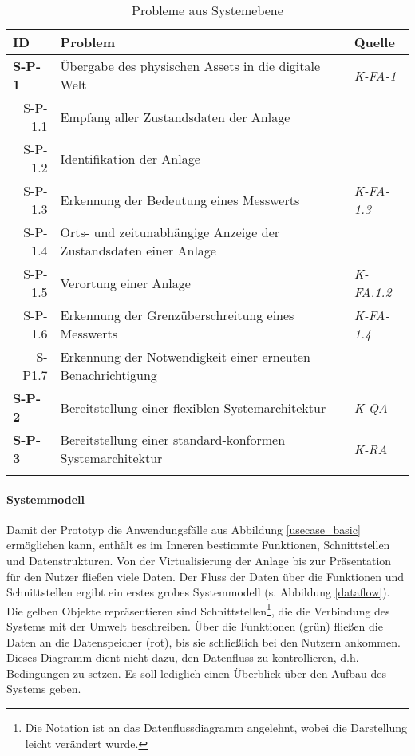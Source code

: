 \begin{table}[ht!]
  \begin{tabularx}{\textwidth}{@{}lXp{2cm}@{}}
      \toprule
      ID                & Problem & Quelle \\
      \midrule
      \textbf{S-P-1}              &       Übergabe des physischen Assets in die digitale Welt               & \textit{K-FA-1}                \\
      \multicolumn{1}{r}{S-P-1.1} &  Empfang aller Zustandsdaten der Anlage     \\
      \multicolumn{1}{r}{S-P-1.2} &  Identifikation der Anlage     \\
      \multicolumn{1}{r}{S-P-1.3} &  Erkennung der Bedeutung eines Messwerts  & \textit{K-FA-1.3}\\
      \multicolumn{1}{r}{S-P-1.4} &  Orts- und zeitunabhängige Anzeige der Zustandsdaten einer Anlage     \\
      \multicolumn{1}{r}{S-P-1.5} &  Verortung einer Anlage & \textit{K-FA.1.2}\\
      \multicolumn{1}{r}{S-P-1.6} &  Erkennung der Grenzüberschreitung eines Messwerts & \textit{K-FA-1.4}\\
      \multicolumn{1}{r}{S-P1.7} &  Erkennung der Notwendigkeit einer erneuten Benachrichtigung\\
      \textbf{S-P-2}              &  Bereitstellung einer flexiblen Systemarchitektur  & \textit{K-QA} \\
      \textbf{S-P-3}              &  Bereitstellung einer standard-konformen Systemarchitektur & \textit{K-RA} \\
      \addlinespace
      \bottomrule
  \end{tabularx}
  \label{system_probleme}
  \caption{Probleme aus Systemebene}

\end{table}


\paragraph{Systemmodell}

Damit der Prototyp die Anwendungsfälle aus Abbildung \ref{usecase_basic} ermöglichen kann, enthält es im Inneren bestimmte Funktionen, Schnittstellen und Datenstrukturen. Von der Virtualisierung der Anlage bis zur Präsentation für den Nutzer fließen viele Daten. Der Fluss der Daten über die Funktionen und Schnittstellen ergibt ein erstes grobes Systemmodell (s. Abbildung \ref{dataflow}). Die gelben Objekte repräsentieren sind Schnittstellen\footnote{Die Notation ist an das Datenflussdiagramm angelehnt, wobei die Darstellung leicht verändert wurde.}, die die Verbindung des Systems mit der Umwelt beschreiben. Über die Funktionen (grün) fließen die Daten an die Datenspeicher (rot), bis sie schließlich bei den Nutzern ankommen. Dieses Diagramm dient nicht dazu, den Datenfluss zu kontrollieren, d.h. Bedingungen zu setzen. Es soll lediglich einen Überblick über den Aufbau des Systems geben.


